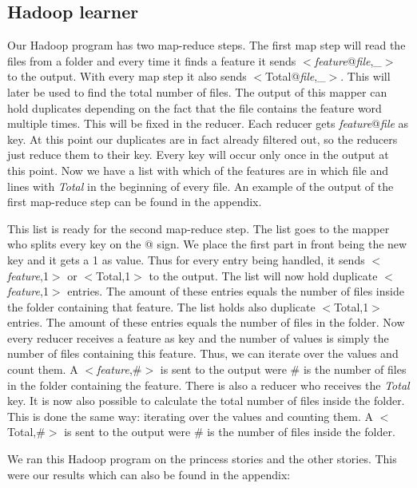 \documentclass{article}
\begin{document}
\subsection{Hadoop learner}
Our Hadoop program has two map-reduce steps. The first map step will read the files from a folder and every time it finds a feature it sends $<$\textit{feature}@\textit{file},\_$>$  to the output. With every map step it also sends $<$Total@\textit{file},\_$>$. This will later be used to find the total number of files. 
The output of this mapper can hold duplicates depending on the fact that the file contains the feature word multiple times. This will be fixed in the reducer.
Each reducer gets \textit{feature}@\textit{file} as key. At this point our duplicates are in fact already filtered out, so the reducers just reduce them to their key. Every key will occur only once in the output at this point. Now we have a list with which of the features are in which file and lines with \textit{Total} in the beginning of every file. An example of the output of the first map-reduce step can be found in the appendix.
\par
This list is ready for the second map-reduce step. The list goes to the mapper who splits every key on the @ sign. We place the first part in front being the new key and it gets a 1 as value. Thus for every entry being handled, it sends $<$\textit{feature},1$>$ or $<$Total,1$>$ to the output. The list will now hold duplicate $<$\textit{feature},1$>$ entries. The amount of these entries equals the number of files inside the folder containing that feature. The list holds also duplicate $<$Total,1$>$ entries. The amount of these entries equals the number of files in the folder. Now every reducer receives a feature as key and the number of values is simply the number of files containing this feature. Thus, we can iterate over the values and count them. A $<$\textit{feature},\#$>$ is sent to the output were \# is the number of files in the folder containing the feature. There is also a reducer who receives the \textit{Total} key. It is now also possible to calculate the total number of files inside the folder. This is done the same way: iterating over the values and counting them. A $<$Total,\#$>$ is sent to the output were \# is the number of files inside the folder.\par
We ran this Hadoop program on the princess stories and the other stories. This were our results which can also be found in the appendix:
\end{document}
